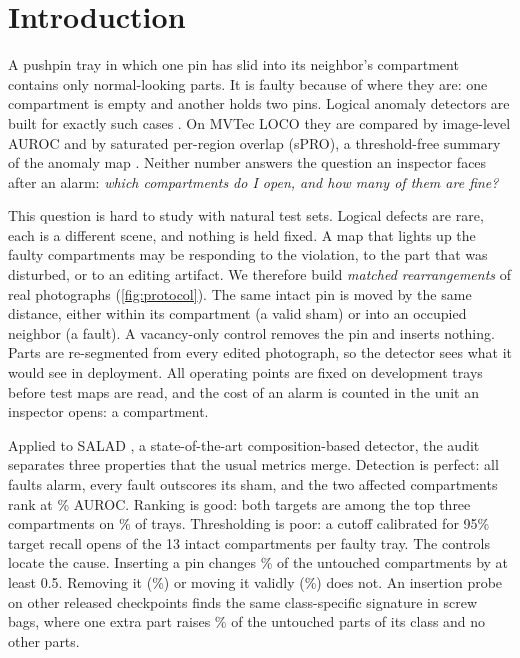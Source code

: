 \section{Introduction}
\label{sec:intro}
A pushpin tray in which one pin has slid into its neighbor's compartment contains only normal-looking parts. It is faulty because of where they are: one compartment is empty and another holds two pins. Logical anomaly detectors are built for exactly such cases \cite{bergmann2022,fucka2025,liu2023,kim2024psad}. On MVTec LOCO they are compared by image-level AUROC and by saturated per-region overlap (sPRO), a threshold-free summary of the anomaly map \cite{bergmann2022}. Neither number answers the question an inspector faces after an alarm: \emph{which compartments do I open, and how many of them are fine?}

This question is hard to study with natural test sets. Logical defects are rare, each is a different scene, and nothing is held fixed. A map that lights up the faulty compartments may be responding to the violation, to the part that was disturbed, or to an editing artifact. We therefore build \emph{matched rearrangements} of real photographs (\cref{fig:protocol}). The same intact pin is moved by the same distance, either within its compartment (a valid sham) or into an occupied neighbor (a fault). A vacancy-only control removes the pin and inserts nothing. Parts are re-segmented from every edited photograph, so the detector sees what it would see in deployment. All operating points are fixed on development trays before test maps are read, and the cost of an alarm is counted in the unit an inspector opens: a compartment.

Applied to SALAD \cite{fucka2025}, a state-of-the-art composition-based detector, the audit separates three properties that the usual metrics merge. Detection is perfect: all \relFaults{} faults alarm, every fault outscores its sham, and the two affected compartments rank at \relAUC\% AUROC. Ranking is good: both targets are among the top three compartments on \relTopThree\% of trays. Thresholding is poor: a cutoff calibrated for 95\% target recall opens \relThrW{} of the 13 intact compartments per faulty tray. The controls locate the cause. Inserting a pin changes \relAnyFault\% of the untouched compartments by at least 0.5. Removing it (\relAnyVac\%) or moving it validly (\relAnySham\%) does not. An insertion probe on other released checkpoints finds the same class-specific signature in screw bags, where one extra part raises \sbAny\% of the untouched parts of its class and no other parts.

